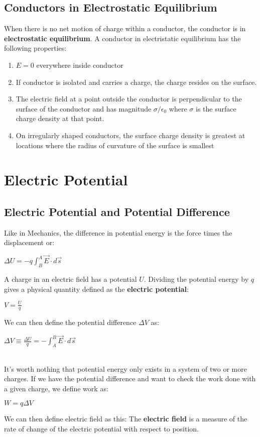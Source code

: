 \documentclass{report}
\begin{document}
	\section{Conductors in Electrostatic Equilibrium}
		When there is no net motion of charge within a conductor, the conductor is in \textbf{electrostatic equilibrium}. A conductor in electristatic equilibrium has the following properties:
		\begin{enumerate}
			\item $E = 0$ everywhere inside conductor
			\item If conductor is isolated and carries a charge, the charge resides on the surface.
			\item The electric field at a point outside the conductor is perpendicular to the surface of the conductor and has magnitude $\sigma/\epsilon_0$ where $\sigma$ is the surface charge density at that point.
			\item On irregularly shaped conductors, the surface charge density is greatest at locations where the radius of curvature of the surface is smallest
		\end{enumerate}
\chapter{Electric Potential}
	\section{Electric Potential and Potential Difference}
		Like in Mechanics, the difference in potential energy is the force times the displacement or:\\
		\centerline{$\Delta U = -q \int_{B}^{A} \vec{E} \cdot d\vec{s}$}
		A charge in an electric field has a potential $U$. Dividing the potential energy by $q$ gives a physical quantity defined as the \textbf{electric potential}:\\
		\centerline{$V = \frac{U}{q}$}
		We can then define the potential difference $\Delta V$ as:\\
		\centerline{$\Delta V \equiv \frac{\Delta U}{q} = -\int_{A}^{B} \vec{E} \cdot d\vec{s}$}\\
		It's worth nothing that potential energy only exists in a system of two or more charges. If we have the potential difference and want to check the work done with a given charge, we define work as:\\
		\centerline{$W = q\Delta V$}
		We can then define electric field as this: The \textbf{electric field} is a measure of the rate of change of the electric potential with respect to position.
\end{document}
